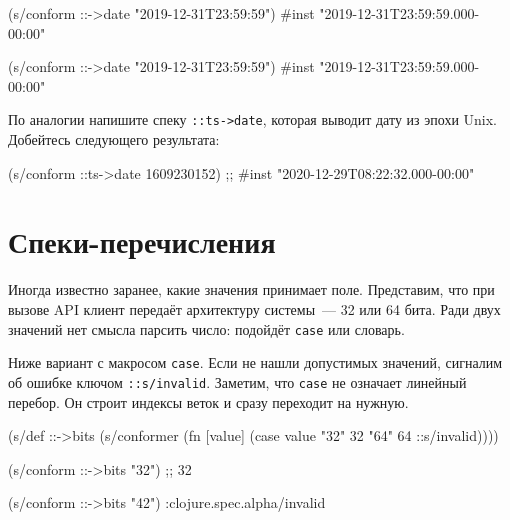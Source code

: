 \begin{english}
  \begin{clojure}
(s/conform ::->date
           "2019-12-31T23:59:59")
#inst "2019-12-31T23:59:59.000-00:00"
  \end{clojure}
\end{english}

\else

\begin{english}
  \begin{clojure}
(s/conform ::->date "2019-12-31T23:59:59")
#inst "2019-12-31T23:59:59.000-00:00"
  \end{clojure}
\end{english}

\fi

По аналогии напишите спеку \verb|::ts->date|, которая выводит дату из эпохи
Unix. Добейтесь следующего результата:

\begin{english}
  \begin{clojure}
(s/conform ::ts->date 1609230152)
;; #inst "2020-12-29T08:22:32.000-00:00"
  \end{clojure}
\end{english}

\section{Спеки-перечисления}


Иногда известно заранее, какие значения принимает поле. Представим, что при
вызове API клиент передаёт архитектуру системы~--- 32 или 64 бита. Ради двух
значений нет смысла парсить число: подойдёт \verb|case| или словарь.

Ниже вариант с макросом \verb|case|. Если не нашли допустимых значений, сигналим
об ошибке ключом \verb|::s/invalid|. Заметим, что \verb|case| не означает
линейный перебор. Он строит индексы веток и сразу переходит на нужную.


\ifx\DEVICETYPE\MOBILE

\begin{english}
  \begin{clojure}
(s/def ::->bits
  (s/conformer
   (fn [value]
     (case value
       "32" 32 "64" 64
       ::s/invalid))))

(s/conform ::->bits "32") ;; 32

(s/conform ::->bits "42")
:clojure.spec.alpha/invalid
  \end{clojure}
\end{english}

